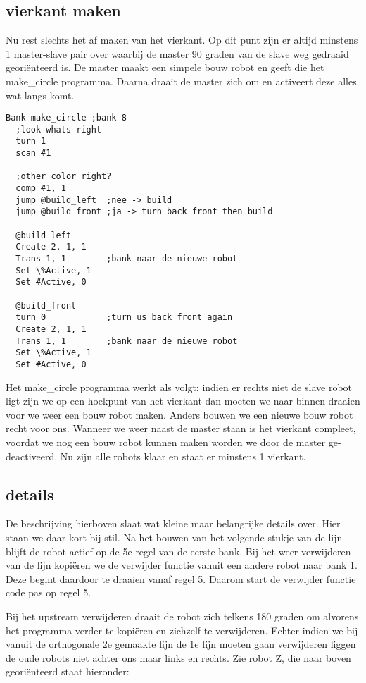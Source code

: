 \documentclass[10pt]{article}
\begin{document}
\subsection{vierkant maken}
Nu rest slechts het af maken van het vierkant. Op dit punt zijn er altijd minstens 1 master-slave pair over waarbij de master 90 graden van de slave weg gedraaid georiënteerd is. De master maakt een simpele bouw robot en geeft die het make\_circle programma. Daarna draait de master zich om en activeert deze alles wat langs komt.


\begin{verbatim}
Bank make_circle ;bank 8
  ;look whats right
  turn 1
  scan #1
  
  ;other color right?
  comp #1, 1 
  jump @build_left  ;nee -> build 
  jump @build_front ;ja -> turn back front then build 

  @build_left
  Create 2, 1, 1
  Trans 1, 1        ;bank naar de nieuwe robot
  Set \%Active, 1
  Set #Active, 0
  
  @build_front
  turn 0            ;turn us back front again
  Create 2, 1, 1
  Trans 1, 1        ;bank naar de nieuwe robot
  Set \%Active, 1
  Set #Active, 0
\end{verbatim}

Het make\_circle programma werkt als volgt: indien er rechts niet de slave robot ligt zijn we op een hoekpunt van het vierkant dan moeten we naar binnen draaien voor we weer een bouw robot maken. Anders bouwen we een nieuwe bouw robot recht voor ons. Wanneer we weer naast de master staan is het vierkant compleet, voordat we nog een bouw robot kunnen maken worden we door de master ge-deactiveerd. Nu zijn alle robots klaar en staat er minstens 1 vierkant.

\subsection{details}
De beschrijving hierboven slaat wat kleine maar belangrijke details over. Hier staan we daar kort bij stil. Na het bouwen van het volgende stukje van de lijn blijft de robot actief op de 5e regel van de eerste bank. Bij het weer verwijderen van de lijn kopiëren we de verwijder functie vanuit een andere robot naar bank 1. Deze begint daardoor te draaien vanaf regel 5. Daarom start de verwijder functie code pas op regel 5.

Bij het upstream verwijderen draait de robot zich telkens 180 graden om alvorens het programma verder te kopiëren en zichzelf te verwijderen. Echter indien we bij vanuit de orthogonale 2e gemaakte lijn de 1e lijn moeten gaan verwijderen liggen de oude robots niet achter ons maar links en rechts. Zie robot Z, die naar boven georiënteerd staat hieronder:
\end{document}
